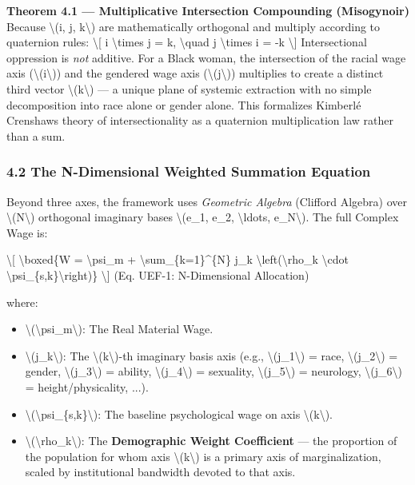 {\textbf{Theorem 4.1 --- Multiplicative Intersection Compounding
(Misogynoir)} Because \textbackslash(i, j, k\textbackslash) are
mathematically orthogonal and multiply according to quaternion rules:
\textbackslash{[} i \textbackslash times j = k, \textbackslash quad j
\textbackslash times i = -k \textbackslash{]} Intersectional oppression
is \emph{not} additive. For a Black woman, the intersection of the
racial wage axis (\textbackslash(i\textbackslash)) and the gendered wage
axis (\textbackslash(j\textbackslash)) multiplies to create a distinct
third vector \textbackslash(k\textbackslash) --- a unique plane of
systemic extraction with no simple decomposition into race alone or
gender alone. This formalizes Kimberlé Crenshaw\textquotesingle s theory
of intersectionality as a quaternion multiplication law rather than a
sum.

\subsubsection{4.2 The N-Dimensional Weighted Summation
Equation}\label{the-n-dimensional-weighted-summation-equation}

Beyond three axes, the framework uses \emph{Geometric Algebra} (Clifford
Algebra) over \textbackslash(N\textbackslash) orthogonal imaginary bases
\textbackslash(e\_1, e\_2, \textbackslash ldots, e\_N\textbackslash).
The full Complex Wage is:

\textbackslash{[} \textbackslash boxed\{W = \textbackslash psi\_m +
\textbackslash sum\_\{k=1\}\^{}\{N\} j\_k
\textbackslash left(\textbackslash rho\_k \textbackslash cdot
\textbackslash psi\_\{s,k\}\textbackslash right)\} \textbackslash{]}
{(Eq. UEF-1: N-Dimensional Allocation)}

where:

\begin{itemize}
\tightlist
\item
  \textbackslash(\textbackslash psi\_m\textbackslash): The Real Material
  Wage.
\item
  \textbackslash(j\_k\textbackslash): The
  \textbackslash(k\textbackslash)-th imaginary basis axis (e.g.,
  \textbackslash(j\_1\textbackslash) = race,
  \textbackslash(j\_2\textbackslash) = gender,
  \textbackslash(j\_3\textbackslash) = ability,
  \textbackslash(j\_4\textbackslash) = sexuality,
  \textbackslash(j\_5\textbackslash) = neurology,
  \textbackslash(j\_6\textbackslash) = height/physicality, ...).
\item
  \textbackslash(\textbackslash psi\_\{s,k\}\textbackslash): The
  baseline psychological wage on axis \textbackslash(k\textbackslash).
\item
  \textbackslash(\textbackslash rho\_k\textbackslash): The
  \textbf{Demographic Weight Coefficient} --- the proportion of the
  population for whom axis \textbackslash(k\textbackslash) is a primary
  axis of marginalization, scaled by institutional bandwidth devoted to
  that axis.
\end{itemize}

}
